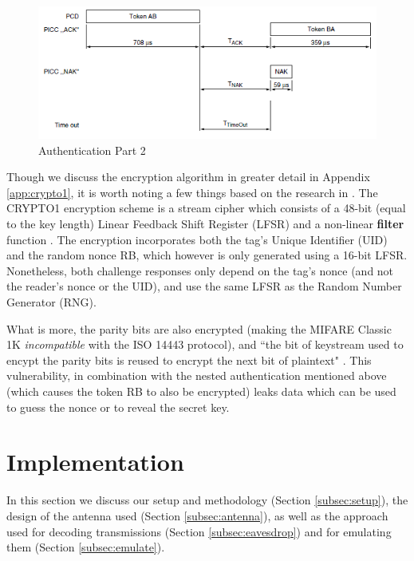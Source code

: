 \documentclass[fleqn,10pt]{SelfArx} %
\begin{document}
\begin{figure}[h]
  \includegraphics[width=\linewidth]{img/auth2}
  \caption{Authentication Part 2 \cite{classic1k}}
  \label{fig:auth2}
\end{figure}

Though we discuss the encryption algorithm in greater detail in Appendix \ref{app:crypto1}, it is worth noting a few things based on the research in \cite{crypto1, classicvulnerabilities}. The CRYPTO1 encryption scheme is a stream cipher which consists of a 48-bit (equal to the key length) Linear Feedback Shift Register (LFSR) and a non-linear {\bf filter} function \cite{crypto1}. The encryption incorporates both the tag's Unique Identifier (UID) and the random nonce RB, which however is only generated using a 16-bit LFSR. Nonetheless, both challenge responses only depend on the tag's nonce (and not the reader's nonce or the UID), and use the same LFSR as the Random Number Generator (RNG). 

What is more, the parity bits are also encrypted (making the MIFARE Classic 1K {\em incompatible} with the ISO 14443 protocol), and ``the bit of keystream used to encypt the parity bits is reused to encrypt the next bit of plaintext" \cite{classicvulnerabilities}. This vulnerability, in combination with the nested authentication mentioned above (which causes the token RB to also be encrypted) leaks data which can be used to guess the nonce or to reveal the secret key.



\section{Implementation}
\label{sec:implementation}

In this section we discuss our setup and methodology (Section \ref{subsec:setup}), the design of the antenna used (Section \ref{subsec:antenna}), as well as the approach used for decoding transmissions (Section \ref{subsec:eavesdrop}) and for emulating them (Section \ref{subsec:emulate}).
\end{document}
